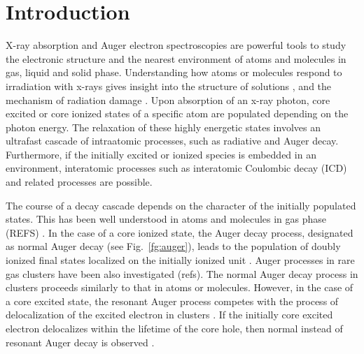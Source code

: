 \section{Introduction}

X-ray absorption and Auger electron spectroscopies are powerful tools to study the electronic structure and the nearest environment of atoms and molecules in gas, liquid and solid phase. Understanding how atoms or molecules respond to irradiation with x-rays gives insight into the structure of solutions \citep{nagasaka14:4388}, and the mechanism of radiation damage \citep{ONeill02:329,Carugo05:213,Stumpf16:237}. Upon absorption of an x-ray photon, core excited or core ionized states of a specific atom are populated depending on the photon energy. The relaxation of these highly energetic states involves an ultrafast cascade of intraatomic processes, such as radiative and Auger decay. Furthermore, if the initially excited or ionized species is embedded in an environment, interatomic processes such as interatomic Coulombic decay (ICD) and related processes \citep{Pokapanich09:7264,Pokapanich11:13430,Stumpf16:237,unger17:708} are possible.


The course of a decay cascade depends on the character of the initially populated states. This has been well understood in atoms and molecules in gas phase (REFS) \citep{stoychev08:074307,Demekhin08:043421,Demekhin09:104303,Ouchi11:053415,Miteva14:164303,Miteva14:064307}. In the case of a core ionized state, the Auger decay process, designated as normal Auger decay (see Fig.\ \ref{fg:auger}), leads to the population of doubly ionized final states localized on the initially ionized unit \citep{stoychev08:074307,Demekhin08:043421,Demekhin09:104303,Ouchi11:053415}. Auger processes in rare gas clusters have been also investigated (refs). The normal Auger decay process in clusters proceeds similarly to that in atoms or molecules. However, in the case of a core excited state, the resonant Auger process competes with the process of delocalization of the excited electron in clusters \citep{Bjorneholm95:3017}. If the initially core excited electron delocalizes within the lifetime of the core hole, then normal instead of resonant Auger decay is observed \citep{Bjorneholm95:3017}. 


